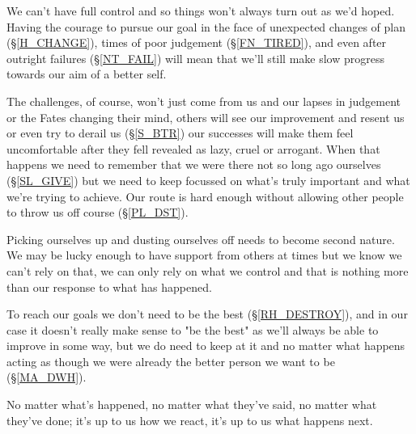 \cleardoublepage
{\small

We can't have full control and so things won't always turn out as we'd hoped. Having the courage to pursue our goal in the face of unexpected changes of plan (\S \ref{H_CHANGE}), times of poor judgement (\S \ref{FN_TIRED}), and even after outright failures (\S \ref{NT_FAIL}) will mean that we'll still make slow progress towards our aim of a better self. 

The challenges, of course, won't just come from us and our lapses in judgement or the Fates changing their mind, others will see our improvement and resent us or even try to derail us (\S \ref{S_BTR}) our successes will make them feel uncomfortable after they fell revealed as lazy, cruel or arrogant. When that happens we need to remember that we were there not so long ago ourselves (\S \ref{SL_GIVE}) but we need to keep focussed on what's truly important and what we're trying to achieve. Our route is hard enough without allowing other people to throw us off course (\S \ref{PL_DST}).

Picking ourselves up and dusting ourselves off needs to become second nature. We may be lucky enough to have support from others at times but we know we can't rely on that, we can only rely on what we control and that is nothing more than our response to what has happened.

To reach our goals we don't need to be the best (\S \ref{RH_DESTROY}), and in our case it doesn't really make sense to "be the best" as we'll always be able to improve in some way, but we do need to keep at it and no matter what happens acting as though we were already the better person we want to be (\S \ref{MA_DWH}).

No matter what's happened, no matter what they've said, no matter what they've done; it's up to us how we react, it's up to us what happens next.

}
